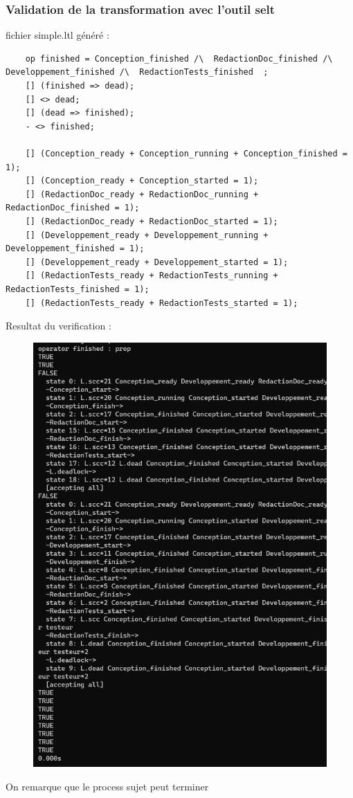 \documentclass{article}
\begin{document}
\subsubsection{Validation de la transformation avec l'outil selt}
fichier simple.ltl généré :
\begin{verbatim}
    op finished = Conception_finished /\  RedactionDoc_finished /\  Developpement_finished /\  RedactionTests_finished  ; 
    [] (finished => dead);
    [] <> dead;
    [] (dead => finished);
    - <> finished;
    
    [] (Conception_ready + Conception_running + Conception_finished = 1);
    [] (Conception_ready + Conception_started = 1);
    [] (RedactionDoc_ready + RedactionDoc_running + RedactionDoc_finished = 1);
    [] (RedactionDoc_ready + RedactionDoc_started = 1);
    [] (Developpement_ready + Developpement_running + Developpement_finished = 1);
    [] (Developpement_ready + Developpement_started = 1);
    [] (RedactionTests_ready + RedactionTests_running + RedactionTests_finished = 1);
    [] (RedactionTests_ready + RedactionTests_started = 1);
\end{verbatim}
Resultat du verification :
\begin{figure}[H]
    \centering
    \includegraphics[width = 15cm]{selt-sujet.png}
\end{figure}
On remarque que le process sujet peut terminer
\end{document}

